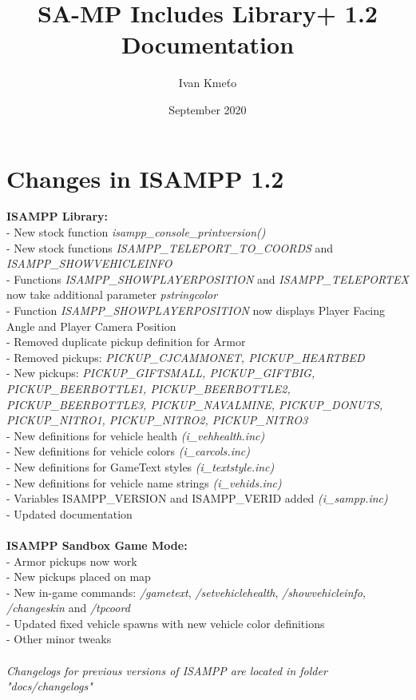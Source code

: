 \documentclass{article}
\title{SA-MP Includes Library+ 1.2 Documentation}
\author{Ivan Kmeťo}
\date{September 2020}
\begin{document}
\maketitle

\newpage
\tableofcontents

\newpage
\section{Changes in ISAMPP 1.2}
\textbf{ISAMPP Library:}
\\- New stock function \textit{isampp\_console\_printversion()}
\\- New stock functions \textit{ISAMPP\_TELEPORT\_TO\_COORDS} and \textit{ISAMPP\_SHOWVEHICLEINFO}
\\- Functions \textit{ISAMPP\_SHOWPLAYERPOSITION} and \textit{ISAMPP\_TELEPORTEX} now take additional parameter \textit{pstringcolor}
\\- Function \textit{ISAMPP\_SHOWPLAYERPOSITION} now displays Player Facing Angle and Player Camera Position
\\- Removed duplicate pickup definition for Armor
\\- Removed pickups: \textit{PICKUP\_CJCAMMONET, PICKUP\_HEARTBED}
\\- New pickups: \textit{PICKUP\_GIFTSMALL, PICKUP\_GIFTBIG, PICKUP\_BEERBOTTLE1, PICKUP\_BEERBOTTLE2, PICKUP\_BEERBOTTLE3, PICKUP\_NAVALMINE, PICKUP\_DONUTS, PICKUP\_NITRO1, PICKUP\_NITRO2, PICKUP\_NITRO3}
\\- New definitions for vehicle health \textit{(i\_vehhealth.inc)}
\\- New definitions for vehicle colors \textit{(i\_carcols.inc)}
\\- New definitions for GameText styles \textit{(i\_textstyle.inc)}
\\- New definitions for vehicle name strings \textit{(i\_vehids.inc)}
\\- Variables ISAMPP\_VERSION and ISAMPP\_VERID added \textit{(i\_sampp.inc)}
\\- Updated documentation
\\
\\
\textbf{ISAMPP Sandbox Game Mode:}
\\- Armor pickups now work
\\- New pickups placed on map
\\- New in-game commands: \textit{/gametext}, \textit{/setvehiclehealth}, \textit{/showvehicleinfo}, \textit{/changeskin} and \textit{/tpcoord}
\\- Updated fixed vehicle spawns with new vehicle color definitions
\\- Other minor tweaks
\\
\\\textit{Changelogs for previous versions of ISAMPP are located in folder "docs/changelogs"}
\end{document}

